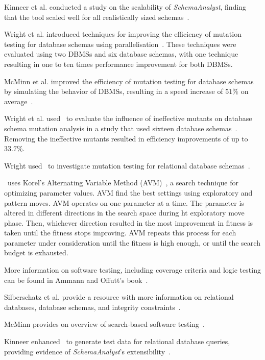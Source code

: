 Kinneer et al. conducted a study on the scalability of \textit{SchemaAnalyst}, finding that the tool scaled well for all
realistically sized schemas~\cite{kinneer2015automatically, Kinneer2015a}.

Wright et al. introduced techniques for improving the efficiency of mutation testing for database schemas using
parallelisation~\cite{wright2013efficient}. These techniques were evaluated using two DBMSs and six database schemas,
with one technique resulting in one to ten times performance improvement for both DBMSs.

McMinn et al. improved the efficiency of mutation testing for database schemas by simulating the behavior of DBMSs,
resulting in a speed increase of $51\%$ on average~\cite{mcminn2016virtual}.

Wright et al. used \sa~to evaluate the influence of ineffective mutants on database schema mutation
analysis in a study that used sixteen database schemas~\cite{wright2014impact}. Removing the ineffective mutants
resulted in efficiency improvements of up to $33.7\%$.

Wright used \sa~to investigate mutation testing for relational database
schemas~\cite{wright2015mutation}.


\sa~uses Korel's Alternating Variable Method (AVM)~\cite{Korel:AVM}, a search technique for
optimizing parameter values. AVM find the best settings using exploratory and pattern moves. AVM operates on one
parameter at a time. The parameter is altered in different directions in the search space during ht exploratory move
phase.  Then, whichever direction resulted in the most improvement in fitness is taken until the fitness stops
improving. AVM repeats this process for each parameter under consideration until the fitness is high enough, or until
the search budget is exhausted.



More information on software testing, including coverage criteria and logic testing can be found in Ammann and Offutt's
book~\cite{ammann2008}.

Silberschatz et al. provide a resource with more information on relational databases, database schemas, and integrity
constraints~\cite{databasebook}.

McMinn provides on overview of search-based software testing~\cite{STVR:STVR294}.

Kinneer enhanced \sa~to generate test data for relational database queries, providing evidence of
\textit{SchemaAnalyst}'s extensibility~\cite{kinneer2016comp}.
